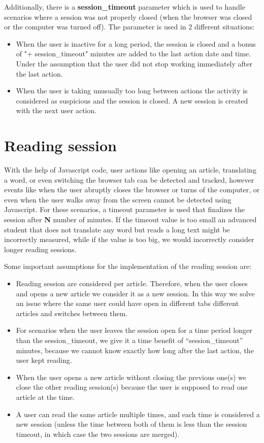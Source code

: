 Additionally, there is a \textbf{session\_timeout} parameter which is used to handle scenarios where a session was not properly closed (\Eg when the browser was closed or the computer was turned off). The parameter is used in 2 different situations:

\begin{itemize}
	\item When the user is inactive for a long period, the session is closed and a bonus of "+ session\_timeout" minutes are added to the last action date and time. Under the assumption that the user did not stop working immediately after the last action.
	
	\item When the user is taking unusually too long between actions the activity is considered as suspicious and the session is closed. A new session is created with the next user action.
\end{itemize}


\section{Reading session}
With the help of Javascript code, user actions like opening an article, translating a word, or even switching the browser tab can be detected and tracked, however events like when the user abruptly closes the browser or turns of the computer, or even when the user walks away from the screen cannot be detected using Javascript. For these scenarios, a timeout parameter is used that finalizes the session after \textbf{N} number of minutes. If the timeout value is too small an advanced student that does not translate any word but reads a long text might be incorrectly measured, while if the value is too big, we would incorrectly consider longer reading sessions.

Some important assumptions for the implementation of the reading session are:
\begin{itemize}
\item Reading session are considered per article. Therefore, when the user closes and opens a new article we consider it as a new session. In this way we solve an issue where the same user could have open in different tabs different articles and switches between them.

\item For scenarios when the user leaves the session open for a time period longer than the session\_timeout, we give it a time benefit of “session\_timeout” minutes, because we cannot know exactly how long after the last action, the user kept reading. 

\item When the user opens a new article without closing the previous one(s) we close the other reading session(s) because the user is supposed to read one article at the time.

\item A user can read the same article multiple times, and each time is considered a new session (unless the time between both of them is less than the session timeout, in which case the two sessions are merged).
\end{itemize}

